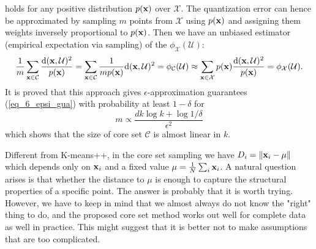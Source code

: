 \documentclass[../book-template.tex]{subfiles}
\begin{document}
holds for any positive distribution $p({\bf x})$ over $\mathcal{X}$. The quantization error can hence be approximated by sampling $m$ points from $\mathcal{X}$ using $p({\bf x})$ and assigning them weights inversely proportional to $p({\bf x})$. Then we have an unbiased estimator (empirical expectation via sampling) of the $\phi_{\mathcal{X}}(\mathcal{U})$:
\begin{equation*}
	\frac{1}{m}\sum_{{\bf x}\in \mathcal{C}}\frac{{\rm d}({\bf x},\mathcal{U})^2}{p({\bf x})} =\sum_{{\bf x}\in \mathcal{C}} \frac{1}{mp({\bf x})}{\rm d}({\bf x},\mathcal{U})^2 = \phi_{\mathcal{C}}(\mathcal{U}) \approx  \sum_{{\bf x}\in \mathcal{X}}p({\bf x})\frac{{\rm d}({\bf x}, \mathcal{U})^2}{p({\bf x})} =\phi_{\mathcal{X}}(\mathcal{U}).
\end{equation*}
It is proved that this approach gives $\epsilon$-approximation guarantees (\ref{eq_6_epsi_gua}) with probability at least $1-\delta$ for
\begin{equation*}
	m\propto\frac{dk\log k+\log 1/\delta}{\epsilon^2}
\end{equation*}
which shows that the size of core set $\mathcal{C}$ is almost linear in $k$.
\begin{remark}
	Different from K-means++, in the core set sampling we have $D_i = \|{\bf x}_i-\mu\|$ which depends only on ${\bf x}_i$ and a fixed value $\mu=\frac{1}{N}\sum_i {\bf x}_i$. A natural question arises is that whether the distance to $\mu$ is enough to capture the structural properties of a specific point. The answer is probably that it is worth trying. However, we have to keep in mind that we almost always do not know the "right" thing to do, and the proposed core set method works out well for complete data as well in practice. This might suggest that it is better not to make assumptions that are too complicated.
\end{remark}
\end{document}
